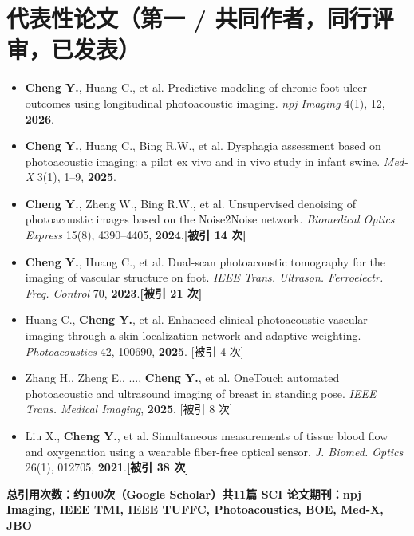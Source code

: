 \documentclass[letterpaper,10pt]{article}
\begin{document}
\vspace{-2pt}

\section{代表性论文（第一 / 共同作者，同行评审，已发表）}

\begin{itemize}[leftmargin=0.2in, itemsep=1pt]
  \item \small \textbf{Cheng Y.}, Huang C., et al. Predictive modeling of chronic foot ulcer outcomes using longitudinal photoacoustic imaging. \textit{npj Imaging} 4(1), 12, \textbf{2026}.
  \item \small \textbf{Cheng Y.}, Huang C., Bing R.W., et al. Dysphagia assessment based on photoacoustic imaging: a pilot ex vivo and in vivo study in infant swine. \textit{Med-X} 3(1), 1--9, \textbf{2025}.
  \item \small \textbf{Cheng Y.}, Zheng W., Bing R.W., et al. Unsupervised denoising of photoacoustic images based on the Noise2Noise network. \textit{Biomedical Optics Express} 15(8), 4390--4405, \textbf{2024}.\quad\textbf{[被引 14 次]}
  \item \small \textbf{Cheng Y.}, Huang C., et al. Dual-scan photoacoustic tomography for the imaging of vascular structure on foot. \textit{IEEE Trans. Ultrason. Ferroelectr. Freq. Control} 70, \textbf{2023}.\quad\textbf{[被引 21 次]}
  \item \small Huang C., \textbf{Cheng Y.}, et al. Enhanced clinical photoacoustic vascular imaging through a skin localization network and adaptive weighting. \textit{Photoacoustics} 42, 100690, \textbf{2025}. [被引 4 次]
  \item \small Zhang H., Zheng E., ..., \textbf{Cheng Y.}, et al. OneTouch automated photoacoustic and ultrasound imaging of breast in standing pose. \textit{IEEE Trans. Medical Imaging}, \textbf{2025}. [被引 8 次]
  \item \small Liu X., \textbf{Cheng Y.}, et al. Simultaneous measurements of tissue blood flow and oxygenation using a wearable fiber-free optical sensor. \textit{J. Biomed. Optics} 26(1), 012705, \textbf{2021}.\quad\textbf{[被引 38 次]}
\end{itemize}
\vspace{2pt}
\noindent\small\textbf{总引用次数：约100次（Google Scholar）\quad 共11篇 SCI 论文\quad 期刊：npj Imaging, IEEE TMI, IEEE TUFFC, Photoacoustics, BOE, Med-X, JBO}
\end{document}
